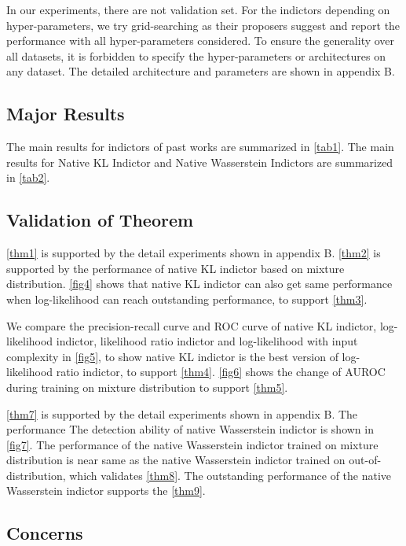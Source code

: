\documentclass[letterpaper]{article} %
\begin{document}
In our experiments, there are not validation set. For the indictors depending on hyper-parameters, we try grid-searching as their proposers suggest and report the performance with all hyper-parameters considered. To ensure the generality over all datasets, it is forbidden to specify the hyper-parameters or architectures on any dataset. 
The detailed architecture and parameters are shown in appendix B. 

\subsection{Major Results}

The main results for indictors of past works are summarized in \cref{tab1}. The main results for Native KL Indictor and Native Wasserstein Indictors are summarized in \cref{tab2}. 

\subsection{Validation of Theorem}

\cref{thm1} is supported by the detail experiments shown in appendix B. \cref{thm2} is supported by the performance of native KL indictor based on mixture distribution. 
\cref{fig4} shows that native KL indictor can also get same performance when log-likelihood can reach outstanding performance, to support \cref{thm3}. 

We compare the precision-recall curve and ROC curve of native KL indictor, log-likelihood indictor, likelihood ratio indictor and log-likelihood with input complexity in \cref{fig5}, to show native KL indictor is the best version of log-likelihood ratio indictor, to support \cref{thm4}. \cref{fig6} shows the change of AUROC during training on mixture distribution to support \cref{thm5}. 

\cref{thm7} is supported by the detail experiments shown in appendix B. The performance The detection ability of native Wasserstein indictor is shown in \cref{fig7}. The performance of the native Wasserstein indictor trained on mixture distribution is near same as the native Wasserstein indictor trained on out-of-distribution, which validates \cref{thm8}. The outstanding performance of the native Wasserstein indictor supports the \cref{thm9}. 

\subsection{Concerns}
\end{document}
